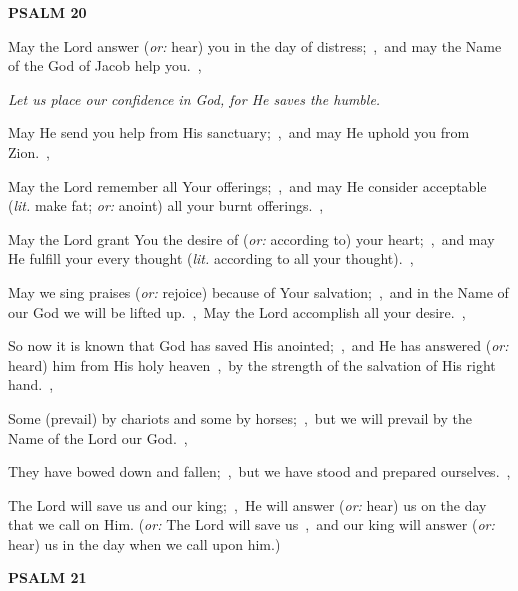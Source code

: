 \documentclass[12pt,twoside,a5paper]{article}
\newcommand{\psalm}[1]{\textbf{PSALM {#1}}\nopagebreak}
\newcommand{\qanona}[1]{{\liturgicalhint{Qanona.} \emph{#1}}}
\newcommand{\translationoption}[1]{\emph{or:} #1}
\newcommand{\translationliteral}[1]{\emph{lit.} #1}
\begin{document}
\psalm{20}

\begin{normalparskip}
  May the Lord answer (\translationoption{hear}) you in the day of distress;~\sep\ and may the Name of the God of Jacob help you.~\sep

  \qanona{Let us place our confidence in God, for He saves the humble.}

  May He send you help from His sanctuary;~\sep\ and may He uphold you from Zion.~\sep

  May the Lord remember all Your offerings;~\sep\ and may He consider acceptable (\translationliteral{make fat}; \translationoption{anoint}) all your burnt offerings.~\sep

  May the Lord grant You the desire of (\translationoption{according to}) your heart;~\sep\ and may He fulfill your every thought (\translationliteral{according to all your thought}).~\sep

  May we sing praises (\translationoption{rejoice}) because of Your salvation;~\sep\ and in the Name of our God we will be lifted up.~\sep\ May the Lord accomplish all your desire.~\sep

  So now it is known that God has saved His anointed;~\sep\ and He has answered (\translationoption{heard}) him from His holy heaven~\sep\ by the strength of the salvation of His right hand.~\sep

  Some (prevail) by chariots and some by horses;~\sep\ but we will prevail by the Name of the Lord our God.~\sep

  They have bowed down and fallen;~\sep\ but we have stood and prepared ourselves.~\sep

  The Lord will save us and our king;~\sep\ He will answer (\translationoption{hear}) us on the day that we call on Him. (\translationoption{The Lord will save us~\sep\ and our king will answer (\translationoption{hear}) us in the day when we call upon him.})
\end{normalparskip}

\psalm{21}
\end{document}
